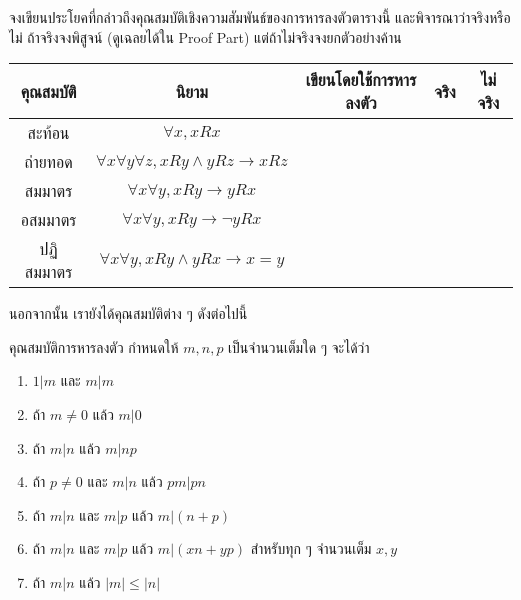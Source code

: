 \begin{exer}\label{divProp}
	จงเขียนประโยคที่กล่าวถึงคุณสมบัติเชิงความสัมพันธ์ของการหารลงตัวตารางนี้ และพิจารณาว่าจริงหรือไม่ ถ้าจริงจงพิสูจน์ (ดูเฉลยได้ใน Proof Part) แต่ถ้าไม่จริงจงยกตัวอย่างค้าน\\
	\begin{tabular}{|c|c|c|c|c|}
		\hline
		คุณสมบัติ        & นิยาม                 & เขียนโดยใช้การหารลงตัว & จริง & ไม่จริง \\ \hline
		สะท้อน           & $\forall x, xRx$ &                        &               &                           \\ \hline
		ถ่ายทอด          & $\forall x\forall y \forall z, xRy \wedge yRz \rightarrow xRz$  &                        &               &                           \\ \hline
		สมมาตร & $\forall x \forall y, xRy \rightarrow yRx$                      &                        &               &                           \\ \hline
		อสมมาตร          & $\forall x \forall y, xRy \rightarrow \neg y Rx$                       &                        &               &                           \\ \hline
		ปฏิสมมาตร        &  $\forall x \forall y, xRy \wedge yRx \rightarrow x = y$                    &                        &               &                           \\ \hline
	\end{tabular}
\end{exer}

นอกจากนั้น เรายังได้คุณสมบัติต่าง ๆ ดังต่อไปนี้
\begin{prop}[label=divProp2]{คุณสมบัติการหารลงตัว}{} 
	กำหนดให้ $m,n,p$ เป็นจำนวนเต็มใด ๆ จะได้ว่า
	\begin{enumerate}[itemsep=0mm]
		\item $1|m$ และ $m|m$
		\item ถ้า $m\neq 0$ แล้ว $m|0$
		\item ถ้า $m|n$ แล้ว $m|np$
		\item ถ้า $p\neq 0$ และ $m|n$ แล้ว $pm|pn$
		\item ถ้า $m|n$ และ $m|p$ แล้ว $m|(n+p)$
		\item ถ้า $m|n$ และ $m|p$ แล้ว $m|(xn+yp)$ สำหรับทุก ๆ จำนวนเต็ม $x, y$
		\item ถ้า $m|n$ แล้ว $|m|\leq |n|$ \label{divProp2:lessthan}
	\end{enumerate}
\end{prop}


